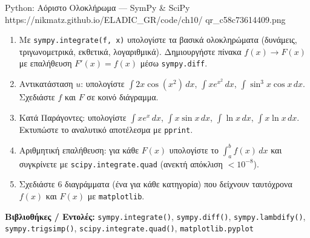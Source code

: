 \begin{pybox}{Python: Αόριστο Ολοκλήρωμα — SymPy \& SciPy}%
             {https://nikmatz.github.io/ELADIC_GR/code/ch10/}%
             {qr_c58c73614409.png}
\label{py:ch10_integral}
\begin{enumerate}[label=(\alph*),itemsep=2pt]
  \item Με \texttt{sympy.integrate(f, x)} υπολογίστε τα βασικά
    ολοκληρώματα (δυνάμεις, τριγωνομετρικά, εκθετικά, λογαριθμικά).
    Δημιουργήστε πίνακα $f(x) \to F(x)$ με επαλήθευση
    $F'(x)=f(x)$ μέσω \texttt{sympy.diff}.
  \item Αντικατάσταση $u$: υπολογίστε $\int 2x\cos(x^2)\,dx$,
    $\int x e^{x^2}\,dx$, $\int\sin^3 x\cos x\,dx$.
    Σχεδιάστε $f$ και $F$ σε κοινό διάγραμμα.
  \item Κατά Παράγοντες: υπολογίστε $\int xe^x\,dx$,
    $\int x\sin x\,dx$, $\int\ln x\,dx$, $\int x\ln x\,dx$.
    Εκτυπώστε το αναλυτικό αποτέλεσμα με \texttt{pprint}.
  \item Αριθμητική επαλήθευση: για κάθε $F(x)$ υπολογίστε
    το $\int_a^b f(x)\,dx$ και συγκρίνετε με
    \texttt{scipy.integrate.quad} (ανεκτή απόκλιση $<10^{-8}$).
  \item Σχεδιάστε 6 διαγράμματα (ένα για κάθε κατηγορία)
    που δείχνουν ταυτόχρονα $f(x)$ και $F(x)$ με \texttt{matplotlib}.
\end{enumerate}
\medskip
\textbf{Βιβλιοθήκες / Εντολές:}
\texttt{sympy.integrate()}, \texttt{sympy.diff()},
\texttt{sympy.lambdify()}, \texttt{sympy.trigsimp()},
\texttt{scipy.integrate.quad()}, \texttt{matplotlib.pyplot}
\end{pybox}
